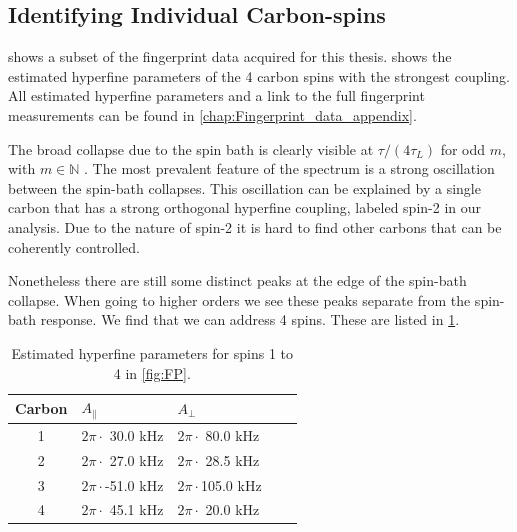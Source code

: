 \subsection*{Identifying Individual Carbon-spins}


 shows a subset of the fingerprint data acquired for this thesis.  shows the estimated hyperfine parameters of the 4 carbon spins with the strongest coupling.
All estimated hyperfine parameters and a link to the full fingerprint measurements can be found in \cref{chap:Fingerprint_data_appendix}.

The broad collapse due to the spin bath is clearly visible at $\tau/(4 \tau _L)$ for odd $m$, with $m \in \mathbb{N}$ .
The most prevalent feature of the spectrum is a strong oscillation between the spin-bath collapses.
This oscillation can be explained by a single carbon that has a strong orthogonal hyperfine coupling, labeled spin-2 in our analysis.
Due to the nature of spin-2 it is hard to find other carbons that can be coherently controlled.

Nonetheless there are still some distinct peaks at the edge of the spin-bath collapse. When going to higher orders we see these peaks separate from the spin-bath response.
We find that we can address 4 spins.
These are listed in \cref{tbl:HF_par}. %




\begin{table}[htbp]
    \begin{tabular}{cllll}
    Carbon & \quad \quad  $A_{\parallel} $ & \quad \quad $A_{\perp}$ \\ \hline
    1         & $2 \pi \cdot${ }30.0 kHz             & $2 \pi \cdot${ }80.0 kHz                \\
    2         & $2 \pi \cdot${ }27.0 kHz             & $2 \pi \cdot${ }28.5 kHz              \\
    3         & $2 \pi \cdot$-51.0 kHz          & $2 \pi \cdot$105.0 kHz              \\
    4         & $2 \pi \cdot${ }45.1 kHz           & $2 \pi \cdot${ }20.0 kHz                \\
    \end{tabular}
    \caption{Estimated hyperfine parameters for spins 1 to 4 in \cref{fig:FP}.}
    \label{tbl:HF_par}
\end{table}
